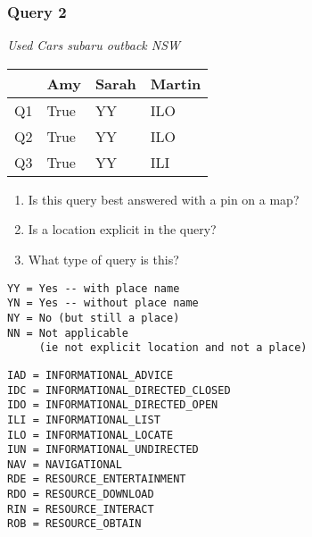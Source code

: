 \begin{frame}[fragile]
\frametitle{Query 2}
\vspace{1em}

\emph{Used Cars subaru outback NSW}

\vfill

\begin{table}
  \centering
  \begin{tabular}{ l l l l }
    & \textbf{Amy} & \textbf{Sarah} & \textbf{Martin}\\
    \toprule
    Q1 & True & YY & ILO\\
Q2 & True & YY & ILO\\
Q3 & True & YY & ILI\\
    \bottomrule
  \end{tabular}
\end{table}

\vfill

\tiny{

\begin{enumerate}
\item Is this query best answered with a pin on a map?
\item Is a location explicit in the query?
\item What type of query is this?
\end{enumerate}

\vfill

\begin{multicols}{2}
\begin{verbatim}
YY = Yes -- with place name
YN = Yes -- without place name
NY = No (but still a place)
NN = Not applicable 
     (ie not explicit location and not a place)
\end{verbatim}

\columnbreak
\begin{verbatim}
IAD = INFORMATIONAL_ADVICE
IDC = INFORMATIONAL_DIRECTED_CLOSED
IDO = INFORMATIONAL_DIRECTED_OPEN
ILI = INFORMATIONAL_LIST
ILO = INFORMATIONAL_LOCATE
IUN = INFORMATIONAL_UNDIRECTED
NAV = NAVIGATIONAL
RDE = RESOURCE_ENTERTAINMENT
RDO = RESOURCE_DOWNLOAD
RIN = RESOURCE_INTERACT
ROB = RESOURCE_OBTAIN
\end{verbatim}
\end{multicols}
}

\end{frame}


